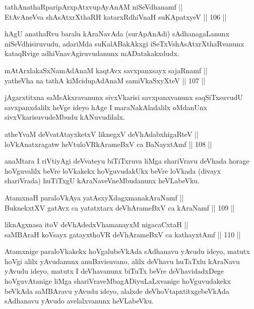 \begin{shl}
tathA\s nathaRparipArxpAtxvupAyAnAM niSeVdhanamf || \\
EtAvAneVva shAsAtxrXthaRH katarxRdhiVnaH suKApatxyeV \hfill || 106 ||  
\end{shl}

\begin{artha}
hAgU anathaRvu baralu kAraNavAda (surApAnAdi) sAdhanagaLanunx
niSeVdhisiruvudu, adariMda suKalABakAkxgi iSeTxVshAsAtxrXthaRvanunx
kataqRvige adhiVnavAgiruvudanunx mADatakakxdudx.
\end{artha}

\begin{shl}
mAtArxlakaSxNamAdAnaM kaqtAvx savxpanxsayx sajaRnamf ||  \\
yatheVha na tathA kiMcidupAdAnaM samiVkaSxyXteV \hfill || 107 ||  
\end{shl}

\begin{artha}
jAgarxtitxna saMsAkxravanunx sivxVkarisi savxpanxvanunx saqSiTxsuvudU
savxpanxdalilx heVge ideyo hAge I maraNakAladalilx oMdanUnx
sivxVkarisuvudeMbudu kANuvudilalx.
\end{artha}

\begin{shl}
atheYvaM deVvatAtayxketxV liknegxV deVhAdabxhigaRteV || \\
loVkAnatxragatw heVtuloVRkArameBxV ca BaNayxtAmf \hfill || 108 ||  
\end{shl}

\begin{artha}
anaMtara I riVtiyAgi deVvateyu biTiTxruva liMga shariVravu deVhada
horage hoVguvalilx beVre loVkakekx hoVguvudakUkx beVre loVkada (divayx
shariVrada) huTiTxgU kAraNaveVneMbudanunx heVLabeVku.
\end{artha}

\begin{shl}
AtamxnaH paraloVkAya yatAsxyXdagxmanakAraNamf ||  \\
BuknekxtXV gatAvx ca yatatxtarx deVhArameBxV ca kAraNamf \hfill || 109 ||  
\end{shl}

\begin{shl}
liknAgxnasa itoV deVhAdedxVhamanayxM nigacaCxtaH || \\
saMBAraH koV\s sayx gatayxthoVR deVhArameBxV ca kathayxtAmf \hfill || 110 ||  
\end{shl}

\begin{artha}
Atamxnige paraloVkakekx hoVgalubeVkAda sAdhanavu yAvudu ideyo, matutx
hoVgi alilx yAvudanunx anuBavisuvano, alilx deVhavu huTaTxlu kAraNavu
yAvudu ideyo, matutx I deVhavanunx biTuTx beVre deVhavidadxDege
hoVguvAtanige liMga shariVraveMbagADiyuLaLxvanige hoVguvudakekx
beVkAda saMBAravu yAvudu ideyo, alalxde deVhoVtapxtitxgebeVkAda
sAdhanavu yAvudo avelalxvanunx heVLabeVku.
\end{artha}

